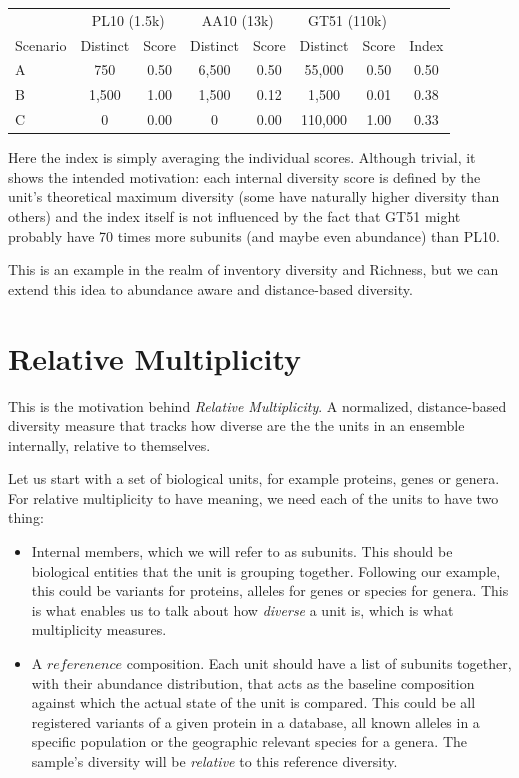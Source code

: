 \documentclass{article}
\begin{document}
\begin{table}[H]
\centering
\begin{tabular}{l|cc|cc|cc|c}
\hline
 & \multicolumn{2}{c|}{PL10 (1.5k)} & \multicolumn{2}{c|}{AA10 (13k)} & \multicolumn{2}{c|}{GT51 (110k)} & \\
Scenario & Distinct & Score & Distinct & Score & Distinct & Score & Index \\
\hline
A & 750     & 0.50 & 6{,}500 & 0.50 & 55{,}000  & 0.50 & 0.50 \\
B & 1{,}500 & 1.00 & 1{,}500 & 0.12 & 1{,}500   & 0.01 & 0.38 \\
C & 0       & 0.00 & 0       & 0.00 & 110{,}000 & 1.00 & 0.33 \\
\hline
\end{tabular}
\label{tab:scenarios}
\end{table}

Here the index is simply averaging the individual scores. Although trivial, it shows the intended motivation: each internal diversity score is defined by the unit's theoretical maximum diversity (some have naturally higher diversity than others) and the index itself is not influenced by the fact that GT51 might probably have 70 times more subunits (and maybe even abundance) than PL10.

This is an example in the realm of inventory diversity and Richness, but we can extend this idea to abundance aware and distance-based diversity. 

\section{Relative Multiplicity}

This is the motivation behind \textit{Relative Multiplicity}. A normalized, distance-based diversity measure that tracks how diverse are the the units in an ensemble internally, relative to themselves.

Let us start with a set of biological units, for example proteins, genes or genera. For relative multiplicity to have meaning, we need each of the units to have two thing:

\begin{itemize}
    \item Internal members, which we will refer to as subunits. This should be biological entities that the unit is grouping together. Following our example, this could be variants for proteins, alleles for genes or species for genera. This is what enables us to talk about how \textit{diverse} a unit is, which is what multiplicity measures.
    \item A $referenence$ composition. Each unit should have a list of subunits together, with their abundance distribution, that acts as the baseline composition against which the actual state of the unit is compared. This could be all registered variants of a given protein in a database, all known alleles in a specific population or the geographic relevant species for a genera. The sample's diversity will be \textit{relative} to this reference diversity.
\end{itemize}
\end{document}
